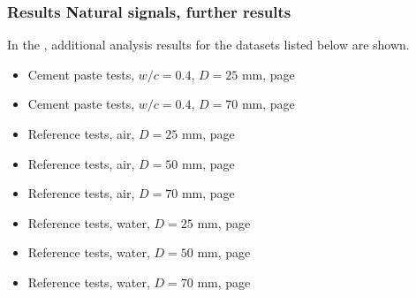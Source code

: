 \documentclass[11pt,aspectratio=169]{beamer}
\begin{document}
	\begin{frame}
		\frametitle{Results \textendash{} Natural signals, further results}
		In the \appendixname, additional analysis results for the datasets listed below are shown.
		\begin{itemize}
			\item Cement paste tests\cite{ts1ds}, $w/c = 0.4$, $D = 25$ mm, page \pageref{app:cem25}
			\item Cement paste tests\cite{ts1ds}, $w/c = 0.4$, $D = 70$ mm, page \pageref{app:cem70}
			\item Reference tests, air\cite{ts5ds}, $D = 25$ mm, page \pageref{app:air25}
			\item Reference tests, air\cite{ts5ds}, $D = 50$ mm, page \pageref{app:air50}
			\item Reference tests, air\cite{ts5ds}, $D = 70$ mm, page \pageref{app:air70}
			\item Reference tests, water\cite{ts6ds}, $D = 25$ mm, page \pageref{app:water25}
			\item Reference tests, water\cite{ts6ds}, $D = 50$ mm, page \pageref{app:water50}
			\item Reference tests, water\cite{ts6ds}, $D = 70$ mm, page \pageref{app:water70}
		\end{itemize}	
	\end{frame}
\end{document}
